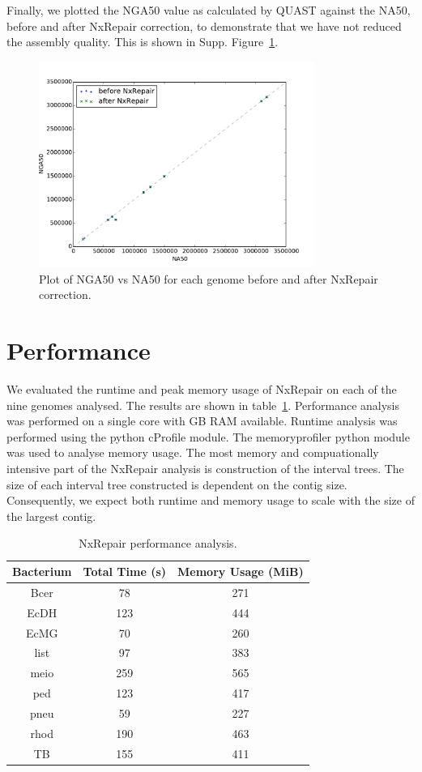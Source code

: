 \documentclass[12pt]{article}
\begin{document}
Finally, we plotted the NGA50 value as calculated by QUAST against the NA50, before and after NxRepair correction, to demonstrate that we have not reduced the assembly quality. This is shown in Supp. Figure~\ref{fig:NGA50}.

\begin{figure}
\centerline{\includegraphics[width=0.8\textwidth]{ng50.pdf}}
\caption{Plot of NGA50 vs NA50 for each genome before and after NxRepair correction.\label{fig:NGA50}}
\end{figure}

\section{Performance}
We evaluated the runtime and peak memory usage of NxRepair on each of the nine genomes analysed. The results are shown in table~\ref{tab:performance}. Performance analysis was performed on a single core with GB RAM available. Runtime analysis was performed using the python cProfile module. The memoryprofiler python module was used to analyse memory usage. The most memory and compuationally intensive part of the NxRepair analysis is construction of the interval trees. The size of each interval tree constructed is dependent on the contig size. Consequently, we expect both runtime and memory usage to scale with the size of the largest contig. 

\begin{table}
\begin{center}
\begin{tabular}{|c|c|c|}
    \hline
    Bacterium & Total Time (s) & Memory Usage (MiB) \\ \hline
    Bcer & 78 & 271 \\
    EcDH & 123 & 444 \\
    EcMG & 70 & 260 \\
    list & 97 & 383 \\
    meio & 259 & 565 \\
    ped & 123 & 417 \\
    pneu & 59 & 227 \\
    rhod & 190 & 463 \\
    TB & 155 & 411 \\ 
    \hline
\end{tabular}
\end{center}
\caption{NxRepair performance analysis. \label{tab:performance}}
\end{table}
\end{document}
